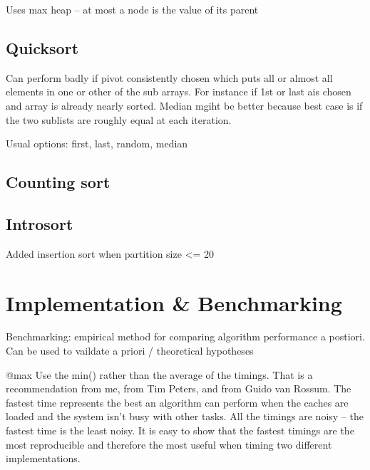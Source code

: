 \documentclass[12pt, a4paper]{article}
\begin{document}
Uses max heap -- at most a node is the value of its parent
\subsection{Quicksort}

Can perform badly if pivot consistently chosen which puts all or almost all elements in one or other of the sub arrays. For instance if 1st or last ais chosen and array is already nearly sorted. Median mgiht be better because best case is if the two sublists are roughly equal at each iteration.

Usual options: first, last, random, median

\subsection{Counting sort}

\subsection{Introsort}

Added insertion sort when partition size <= 20 


\section{Implementation \& Benchmarking}

Benchmarking: empirical method for comparing algorithm performance a postiori. Can be used to vaildate a priori / theoretical hypotheses

@max Use the min() rather than the average of the timings. That is a recommendation from me, from Tim Peters, and from Guido van Rossum. The fastest time represents the best an algorithm can perform when the caches are loaded and the system isn't busy with other tasks. All the timings are noisy -- the fastest time is the least noisy. It is easy to show that the fastest timings are the most reproducible and therefore the most useful when timing two different implementations.
\end{document}
